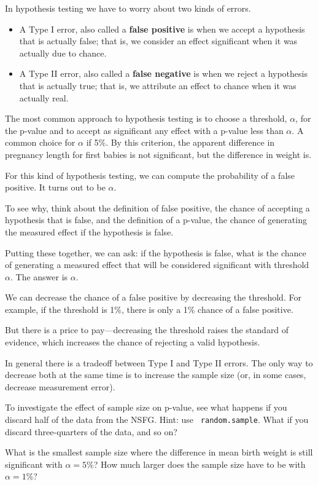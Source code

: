 \documentclass[10pt]{book}
\begin{document}
In hypothesis testing we have to worry about two kinds of errors.

\begin{itemize}

\item A Type I error, also called a {\bf false positive} is when we accept
a hypothesis that is actually false; that is, we consider an
effect significant when it was actually due to chance. 

\item A Type II error, also called a {\bf false negative} is when we
reject a hypothesis that is actually true; that is, we attribute an
effect to chance when it was actually real.

\end{itemize}

The most common approach to hypothesis testing is to choose a
threshold, $\alpha$, for the p-value and to accept as significant any
effect with a p-value less than $\alpha$.  A common choice for
$\alpha$ if 5\%.  By this criterion, the apparent difference in
pregnancy length for first babies is not significant, but the
difference in weight is.

For this kind of hypothesis testing, we can compute the probability of
a false positive.  It turns out to be $\alpha$.

To see why, think about the definition of false positive, the chance
of accepting a hypothesis that is false, and the definition of a
p-value, the chance of generating the measured effect if the
hypothesis is false.

Putting these together, we can ask: if the hypothesis is false,
what is the chance of generating a measured effect that will be
considered significant with threshold $\alpha$.  The answer is
$\alpha$.

We can decrease the chance of a false positive by decreasing the
threshold.  For example, if the threshold is 1\%, there is only a 1\%
chance of a false positive.

But there is a price to pay---decreasing the threshold raises the
standard of evidence, which increases the chance of rejecting
a valid hypothesis.

In general there is a tradeoff between Type I and Type II errors.
The only way to decrease both at the same time is to increase the
sample size (or, in some cases, decrease measurement error).

\begin{ex}

To investigate the effect of sample size on p-value, see what happens
if you discard half of the data from the NSFG.  Hint: use {\tt
  random.sample}.  What if you discard three-quarters of the data, and
so on?

What is the smallest sample size where the difference in mean birth
weight is still significant with $\alpha=5$\%?  How much
larger does the sample size have to be with $\alpha=1$\%?

\end{ex}
\end{document}
